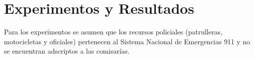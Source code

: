 \section{Experimentos y Resultados}
Para los experimentos se asumen que los recursos policiales (patrulleras, motocicletas y oficiales) pertenecen al Sistema Nacional de Emergencias 911 y no se encuentran adscriptos a las comisarías.